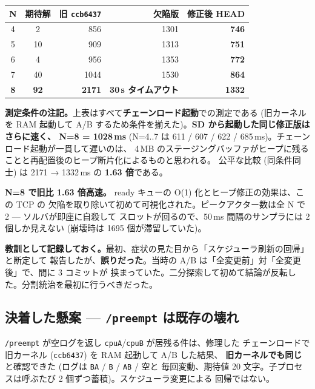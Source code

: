 \documentclass[a4paper,11pt]{ltjsarticle}
\begin{document}
\begin{center}\small
\begin{tabular}{@{}c c r r r@{}}
\toprule
\textbf{N} & \textbf{期待解} & \textbf{旧 \texttt{ccb6437}} & \textbf{欠陥版} & \textbf{修正後 HEAD}\\ \midrule
4 & 2  &  856 & 1301 & \textbf{746}\\
5 & 10 &  909 & 1313 & \textbf{751}\\
6 & 4  &  956 & 1353 & \textbf{772}\\
7 & 40 & 1044 & 1530 & \textbf{864}\\
\textbf{8} & \textbf{92} & \textbf{2171} & \textbf{30\,s タイムアウト} & \textbf{1332}\\
\bottomrule
\end{tabular}
\end{center}

\textbf{測定条件の注記。}上表はすべて\textbf{チェーンロード起動}での測定である (旧カーネルを
RAM 起動して A/B するため条件を揃えた)。\textbf{SD から起動した同じ修正版はさらに速く、
N=8 = 1028\,ms} (N=4..7 は 611 / 607 / 622 / 685\,ms)。チェーンロード起動が一貫して遅いのは、
4\,MB のステージングバッファがヒープに残ることと再配置後のヒープ断片化によるものと思われる。
公平な比較 (同条件同士) は 2171 → 1332\,ms の\textbf{ 1.63 倍}である。

\textbf{N=8 で旧比 1.63 倍高速。} ready キューの O(1) 化とヒープ修正の効果は、この TCP の
欠陥を取り除いて初めて可視化された。ピークアクター数は全 N で 2 --- ソルバが即座に自殺して
スロットが回るので、50\,ms 間隔のサンプラには 2 個しか見えない (崩壊時は 1695 個が滞留していた)。

\textbf{教訓として記録しておく。}最初、症状の見た目から「スケジューラ刷新の回帰」と断定して
報告したが、\textbf{誤りだった}。当時の A/B は「全変更前」対「全変更後」で、間に 3 コミットが
挟まっていた。二分探索して初めて結論が反転した。分割統治を最初に行うべきだった。

\subsection{決着した懸案 --- \texttt{/preempt} は既存の壊れ}

\texttt{/preempt} が空ログを返し \texttt{cpuA}/\texttt{cpuB} が居残る件は、修理した
チェーンロードで旧カーネル (\texttt{ccb6437}) を RAM 起動して A/B した結果、
\textbf{旧カーネルでも同じ}と確認できた (ログは \texttt{BA} / \texttt{B} / \texttt{AB} / 空と
毎回変動、期待値 20 文字。子プロセスは呼ぶたび 2 個ずつ蓄積)。スケジューラ変更による
回帰ではない。
\end{document}
